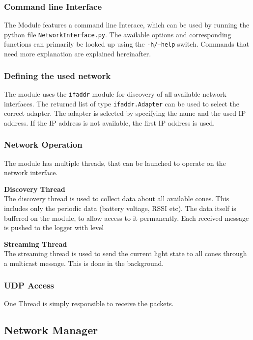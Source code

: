 \subsubsection{Command line Interface}
The Module features a command line Interace, which can be used by running the python file \texttt{NetworkInterface.py}. The available options and corresponding functions can primarily be looked up using the \texttt{-h/--help} switch. Commands that need more explanation are explained hereinafter.  

\subsubsection{Defining the used network}
The module uses the \texttt{ifaddr} module for discovery of all available network interfaces. The returned list of type \texttt{ifaddr.Adapter} can be used to select the correct adapter. The adapter is selected by specifying the name and the used IP address. If the \ac{IP} address is not available, the first \ac{IP} address is used. 

\subsubsection{Network Operation}
The module has multiple threads, that can be launched to operate on the network interface. 

\textbf{Discovery Thread}\\
The discovery thread is used to collect data about all available cones. This includes only the periodic data (battery voltage, \ac{RSSI} etc). The data itself is buffered on the module, to allow access to it permanently. Each received message is pushed to the logger with level 

\textbf{Streaming Thread}\\
The streaming thread is used to send the current light state to all cones through a multicast message. This is done in the background. 

\subsubsection{\acs{UDP} Access}
One Thread is simply responsible to receive the packets.

\subsection{Network Manager}




